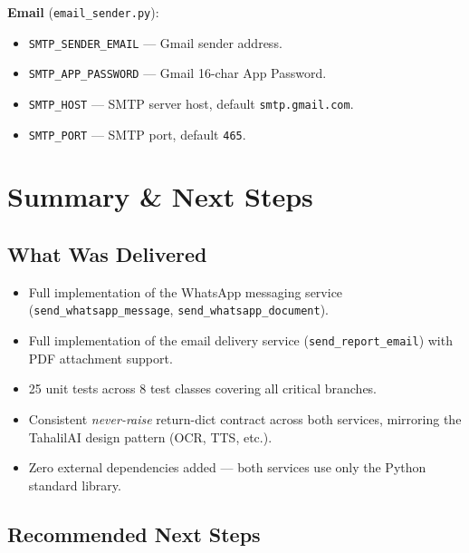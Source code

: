 \documentclass[12pt, a4paper]{article}
\begin{document}
\medskip
\textbf{Email} (\texttt{email\_sender.py}):
\begin{itemize}[leftmargin=1.5em, nosep]
  \item \texttt{SMTP\_SENDER\_EMAIL} — Gmail sender address.
  \item \texttt{SMTP\_APP\_PASSWORD} — Gmail 16-char App Password.
  \item \texttt{SMTP\_HOST} — SMTP server host, default \texttt{smtp.gmail.com}.
  \item \texttt{SMTP\_PORT} — SMTP port, default \texttt{465}.
\end{itemize}

\section{Summary \& Next Steps}

\subsection{What Was Delivered}

\begin{successbox}
  \begin{itemize}[leftmargin=1em, nosep]
    \item Full implementation of the WhatsApp messaging service
          (\texttt{send\_whatsapp\_message}, \texttt{send\_whatsapp\_document}).
    \item Full implementation of the email delivery service
          (\texttt{send\_report\_email}) with PDF attachment support.
    \item 25 unit tests across 8 test classes covering all critical branches.
    \item Consistent \textit{never-raise} return-dict contract across both
          services, mirroring the TahalilAI design pattern (OCR, TTS, etc.).
    \item Zero external dependencies added — both services use only the
          Python standard library.
  \end{itemize}
\end{successbox}

\subsection{Recommended Next Steps}
\end{document}
